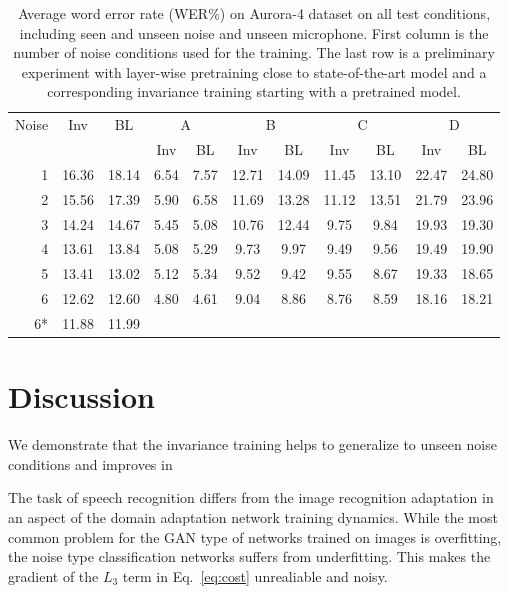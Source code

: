 \documentclass{article}
\begin{document}
\begin{table}
    \centering
    \caption{Average word error rate (WER\%) on Aurora-4 dataset on all test conditions,
        including seen and unseen noise and unseen microphone. First column
        is the number of noise conditions used for the training. The last row is a 
        preliminary experiment with layer-wise pretraining close to state-of-the-art
        model and a corresponding invariance training starting with a pretrained model.}
    \label{tab:results}
    \begin{tabular}{r|cc||cc|cc|cc|cc}
        Noise       &Inv&BL&  \multicolumn{2}{c|}{A} & \multicolumn{2}{c|}{B} & \multicolumn{2}{c|}{C} & \multicolumn{2}{c}{D}\\
               & & &  Inv & BL & Inv & BL & Inv & BL & Inv & BL\\
    \hline
    1           &16.36        &18.14 &6.54&7.57    &12.71& 14.09   & 11.45&   13.10    & 22.47 &   24.80    \\
    2           &15.56        &17.39 &5.90&  6.58 &   11.69   &13.28   &11.12   &13.51   &21.79   &23.96 \\
    3           &14.24        &14.67 &5.45 & 5.08&    10.76&   12.44&   9.75&    9.84 &   19.93&   19.30\\
    4           &13.61        &13.84 & 5.08 &5.29    &9.73    &9.97    &9.49    &9.56    &19.49   &19.90\\         
    5           &13.41        &13.02 & 5.12 &5.34    &9.52    &9.42    &9.55    &8.67    &19.33   &18.65\\         
    6           &12.62        &12.60 & 4.80 &4.61    &9.04    &8.86    &8.76    &8.59    &18.16   &18.21\\
    \hline\hline
    6* &11.88        &11.99
    \end{tabular}
\end{table}

\section{Discussion}
    We demonstrate that the invariance training helps to generalize to unseen noise
    conditions and improves in 
    
    The task of speech recognition differs from the image recognition
    adaptation in an aspect of the domain adaptation network training dynamics. 
    While the most common problem for the GAN type of networks trained on images 
    is overfitting, the noise type classification networks suffers from 
    underfitting. This makes the gradient of the $L_3$ term in Eq.~\ref{eq:cost}
    unrealiable and noisy. 
\end{document}
